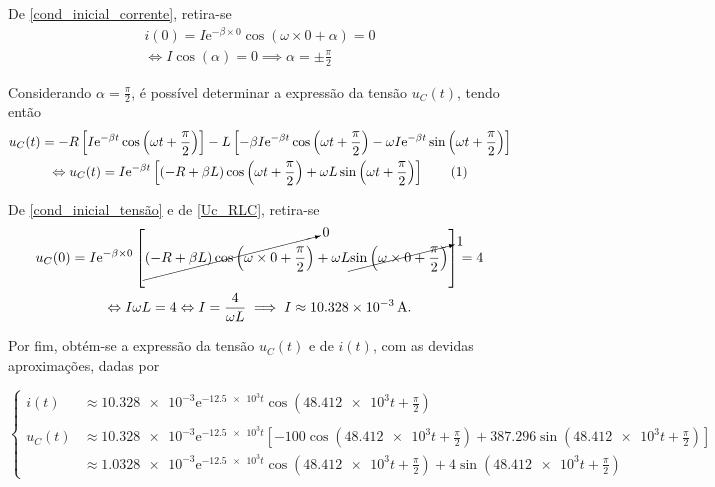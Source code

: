 \documentclass[a4paper, titlepage, portuguese]{article}
\newcommand{\eq}{\Leftrightarrow} %
\newcommand\numberthis{\addtocounter{equation}{1}\tag{\theequation}}
\newcommand\e{\mathrm{e} }
\begin{document}
		De \eqref{cond_inicial_corrente}, retira-se 
		\begin{gather*}
			 i(0) = I\e^{-\beta \times 0} \cos{(\omega \times 0 + \alpha)} = 0 \\ \eq
			 I\cos{(\alpha)} = 0 \implies \alpha = \pm \frac{\pi}{2}
		\end{gather*}
		
		Considerando $\alpha =  \frac{\pi}{2}$, é possível determinar a expressão da tensão $u_{C}(t)$, tendo então 
		\begin{gather*}
			u_C(t) = -R \left[ I\e^{-\beta t} \cos{\left(\omega t + \frac{\pi}{2}\right)} \right] - L \left[ -\beta I\e^{-\beta t} \cos{\left(\omega t + \frac{\pi}{2}\right)} - \omega I\e^{-\beta t} \sin{\left(\omega t + \frac{\pi}{2}\right)}\right] \\ \eq
			u_C(t) = I\e^{-\beta t} \left[ \left( -R +\beta L\right) \cos{\left(\omega t + \frac{\pi}{2}\right)}  + \omega L\sin{\left(\omega t + \frac{\pi}{2}\right)} \right] \numberthis \label{Uc_RLC}
			\end{gather*}
			
		De \eqref{cond_inicial_tensão} e de \eqref{Uc_RLC}, retira-se 
		\begin{gather*}
			u_{C}(0) = I\e^{-\beta \times 0} \left[ \cancelto{0}{\left( -R +\beta L\right) \cos{\left(\omega \times 0 + \frac{\pi}{2}\right)}}  + \omega L \cancelto{1}{\sin{\left(\omega \times 0 + \frac{\pi}{2}\right)}} \right] = 4 \\ \eq
			 I\omega L = 4 \eq I = \frac{4}{\omega L} \implies I \approx \SI{10.328e-3}{\ampere}.
		\end{gather*}
		
		Por fim, obtém-se a expressão da tensão $u_{C}(t)$ e de $i(t)$, com as devidas aproximações, dadas por
		
		\begin{equation}
   			\begin{cases}
      			i(t) &\approx \num{10.328e-3}\e^{-\num{12.5e3}t} \cos{(\num{48.412e3} t + \frac{\pi}{2})} \\
    			\\u_C(t) &\approx \num{10.328e-3}\e^{-\num{12.5e3} t} \left[ -100 \cos{\left(\num{48.412e3} t + \frac{\pi}{2}\right)}  + \num{387.296}\sin{\left(\num{48.412e3}t + \frac{\pi}{2}\right)} \right] \\ 
			&\approx \num{1.0328e-3}\e^{-\num{12.5e3} t} \cos{\left(\num{48.412e3} t + \frac{\pi}{2}\right)}  + \num{4}\sin{\left(\num{48.412e3}t + \frac{\pi}{2}\right)}
  			\end{cases}       
		\end{equation}
		
\end{document}
